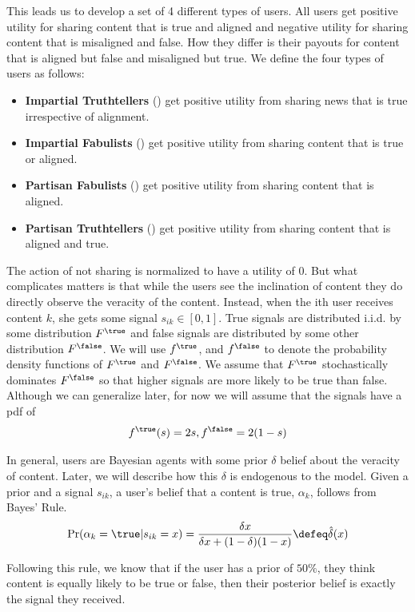 This leads us to develop a set of 4 different types of users. All users get positive utility for sharing content that is true and aligned and negative utility for sharing content that is misaligned and false. How they differ is their payouts for content that is aligned but false and misaligned but true. We define the four types of users as follows: 
\begin{itemize}
    \item \textbf{Impartial Truthtellers} (\IT) get positive utility from sharing news that is true irrespective of alignment. 
    \item \textbf{Impartial Fabulists} (\IF) get positive utility from sharing content that is true or aligned. 
    \item \textbf{Partisan Fabulists} (\PF) get positive utility from sharing content that is aligned. 
    \item \textbf{Partisan Truthtellers} (\PT) get positive utility from sharing content that is aligned and true. 
\end{itemize}


The action of not sharing is normalized to have a utility of 0. But what complicates matters is that while the users see the inclination of content they do directly observe the veracity of the content. Instead, when the ith user receives content $k$, she gets some signal $s_{ik} \in [0,1]$. True signals are distributed i.i.d. by some distribution $F^\true$ and false signals are distributed by some other distribution $F^\false$. We will use $f^\true$, and $f^\false$ to denote the probability density functions of $F^\true$ and  $F^\false$. We assume that $F^\true$ stochastically dominates $F^\false$ so that higher signals are more likely to be true than false.  Although we can generalize later, for now we will assume that the signals have a pdf of 
\[
f^\true(s) = 2s , f^\false = 2(1-s)
\]

In general, users are Bayesian agents with some prior $\delta$ belief about the veracity of content. Later, we will describe how this $\delta$ is endogenous to the model. Given a prior and a signal $s_{ik}$, a user's belief that a content is true, $\alpha_k$, follows from Bayes' Rule. 
\begin{equation}
    \Pr(\alpha_k = \true | s_{ik} = x ) = \frac{\delta x}{ \delta x + (1-\delta) (1-x) }\defeq \hat{\delta}(x)
\end{equation}

Following this rule, we know that if the user has a prior of $50\%$, they think content is equally likely to be true or false, then their posterior belief is exactly the signal they received. 

